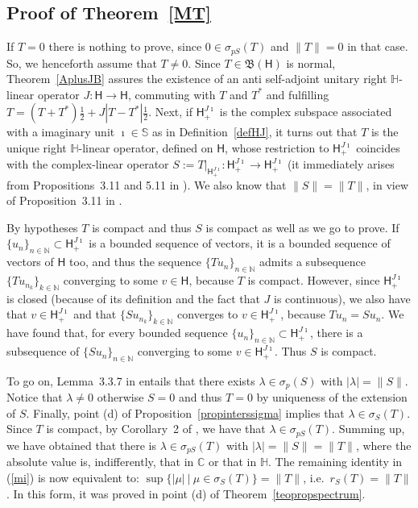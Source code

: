 \documentclass{birkmult}
\theoremstyle{definition}
\theoremstyle{remark}
\numberwithin{equation}{section}
\begin{document}
\subsection{Proof of Theorem~\ref{MT}}
If $T =0$ there is nothing to prove, since $0 \in \sigma_{pS}(T)$ and $\|T\|=0$ in that case. So, we henceforth assume that $T\neq 0$. 
Since $T \in {{\mathfrak B}}({\mathsf{H}})$ is normal, Theorem~\ref{AplusJB} assures the existence of  an anti self-adjoint unitary 
right ${{\mathbb H}}$-linear operator $J : {\mathsf{H}} \to {\mathsf{H}}$, commuting with $T$ and $T^*$ and fulfilling
$T= (T+T^*)\frac{1}{2} + J|T-T^*|\frac{1}{2}$.  Next, if ${\mathsf{H}}_+^{J\imath}$ is the complex subspace 
associated with a imaginary unit $\imath \in {{\mathbb S}}$ as in Definition~\ref{defHJ}, it turns out that
$T$ is the unique right ${{\mathbb H}}$-linear operator, defined on ${\mathsf{H}}$, whose restriction to ${\mathsf{H}}_+^{J\imath}$ coincides with the complex-linear operator $S:= T |_{{\mathsf{H}}_+^{J\imath}}: {\mathsf{H}}_+^{J\imath} \to {\mathsf{H}}_+^{J\imath}$ (it immediately arises from
 Propositions~3.11  and 5.11 in \cite{GhMoPe}).
We also know that $\|S\|= \|T\|$, in view of Proposition~3.11 in \cite{GhMoPe}.

By hypotheses $T$ is compact and thus $S$ is compact as well as we go to prove. If $\{u_n\}_{n\in {{\mathbb N}}} \subset {\mathsf{H}}_+^{J\imath}$ is a bounded sequence of vectors, it is a bounded sequence of vectors of ${\mathsf{H}}$ too,  and thus  the sequence $\{Tu_n\}_{n\in {{\mathbb N}}}$ admits a subsequence $\{Tu_{n_k}\}_{k\in {{\mathbb N}}}$ converging to some   $v \in {\mathsf{H}}$, because $T$ is compact.  However, since ${\mathsf{H}}_+^{J\imath}$
is closed (because of its definition and the fact that $J$ is continuous), we also have that $v \in {\mathsf{H}}_+^{J\imath}$ and  that $\{Su_{n_k}\}_{k\in {{\mathbb N}}}$ converges 
to   $v \in {\mathsf{H}}_+^{J\imath}$, because $Tu_n = Su_n$. We have found that, 
for every bounded sequence $\{u_n\}_{n\in {{\mathbb N}}} \subset {\mathsf{H}}_+^{J\imath}$, there is a subsequence of $\{Su_n\}_{n\in {{\mathbb N}}}$
converging to some    $v \in {\mathsf{H}}_+^{J\imath}$. Thus $S$ is compact.

To go on,  Lemma~3.3.7 in \cite{Analysisnow} entails that there exists $\lambda \in \sigma_p(S)$
with $|\lambda| = \|S\|$. Notice that $\lambda \neq 0$ otherwise $S=0$ and thus $T=0$ 
by uniqueness of the extension of $S$.
Finally, point (d) of Proposition~\ref{propinterssigma} 
implies that $\lambda \in \sigma_{S}(T)$.
Since $T$ is compact,  by Corollary~2 of \cite{Fashandi2}, we have that
$\lambda \in \sigma_{pS}(T)$. Summing up, we have obtained that there is 
$\lambda \in \sigma_{pS}(T)$ with $|\lambda| = \|S\|= \|T\|$, where the absolute value is, indifferently, that in ${{\mathbb C}}$ or that in ${{\mathbb H}}$. The remaining identity in (\ref{mi}) is now equivalent to:
$\sup\{|\mu| \:|\:   \mu \in \sigma_S(T) \}    = \|T\|$, i.e.\ $r_S(T)=\|T\|$. In this form, it was proved in point (d) of Theorem~\ref{teopropspectrum}. 
\end{document}
